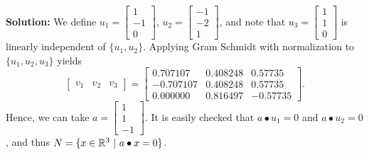 \textbf{Solution:} We define $u_1=\left[ \begin{array}{r} 1 \\ -1 \\ 0 \end{array} \right] $, $u_2=\left[ \begin{array}{r} -1 \\ -2 \\ 1 \end{array} \right] $, and note that $u_3=\left[ \begin{array}{r} 1 \\ 1 \\ 0 \end{array} \right] $ is linearly independent of $\{ u_1, u_2\}$. Applying Gram Schmidt with normalization to $\{ u_1, u_2, u_3  \}$ yields
$$\left[ \begin{array}{ccc} v_1 & v_2 & v_3 \end{array} \right] = \left[ \begin{array}{rrr}  0.707107 & 0.408248  & 0.57735 \\
 -0.707107 & 0.408248 &  0.57735 \\
  0.000000 &0.816497  & -0.57735 \end{array} \right]. $$
  Hence, we can take $a=\left[ \begin{array}{r} 1 \\ 1 \\ -1\end{array} \right]$. It is easily checked that $a \bullet u_1= 0$ and $a \bullet u_2 = 0$, and thus $N=\{ x\in \mathbb R^3~|~ a\bullet x = 0 \}$. 
 \Qed


